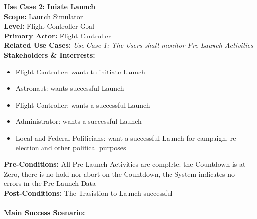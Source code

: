 \documentclass[letterpaper]{article}
\begin{document}
\noindent
\textbf{Use Case 2:  Iniate Launch}\\
\textbf{Scope:  }Launch Simulator\\
\textbf{Level:  }Flight Controller Goal\\
\textbf{Primary Actor:  }Flight Controller\\
\textbf{Related Use Cases:  }\textit{Use Case 1:  The Users shall
monitor Pre-Launch Activities}\\
\textbf{Stakeholders \& Interrests:  }
\begin{itemize}
\item Flight Controller:  wants to initiate Launch
\item Astronaut:  wants successful Launch
\item Flight Controller:  wants a successful Launch
\item Administrator:  wants a successful Launch
\item Local and Federal Politicians:  want a successful Launch for
campaign, re-election and other political purposes
\end{itemize}
\textbf{Pre-Conditions:  }All Pre-Launch Activities are complete:  the
Countdown is at Zero, there is no hold nor abort on the Countdown, the
System indicates no errors in the Pre-Launch Data\\
\textbf{Post-Conditions:  }The Trasistion to Launch successful\\\\
\textbf{Main Success Scenario:  }\\
\end{document}
